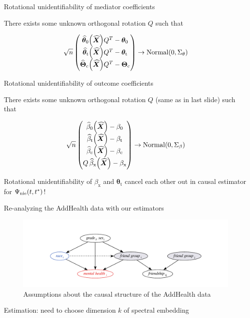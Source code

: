 \documentclass{beamer}
\theoremstyle{remark}
\newcommand{\X}{\bm X}
\newcommand{\Xhat}{\widehat{\X}}
\newcommand{\thetazero}{\bm \theta_0}
\newcommand{\thetat}{\bm \theta_\text{t}}
\newcommand{\Thetac}{\bm \Theta_\text{c}}
\newcommand \thetazerohat [1] {\widehat{\bm \theta}_0 \paren*{#1}}
\newcommand \thetathat [1] {\widehat{\bm \theta}_\text{t} \paren*{#1}}
\newcommand \Thetachat [1] {\widehat{\bm \Theta}_\text{c} \paren*{#1}}
\newcommand{\betazero}{\beta_0}
\newcommand{\betat}{\beta_\text{t}}
\newcommand{\betac}{\beta_\text{c}}
\newcommand{\betax}{\beta_\text{x}}
\newcommand \betazerohat [1] {\widehat{\beta}_0 \paren*{#1}}
\newcommand \betathat [1] {\widehat{\beta}_\text{t} \paren*{#1}}
\newcommand \betachat [1] {\widehat{\beta}_\text{c} \paren*{#1}}
\newcommand \betaxhat [1] {\widehat{\beta}_\text{x} \paren*{#1}}
\newcommand{\nie}{\Psi_\text{nie} \paren*{t, t^*}}
\DeclarePairedDelimiter{\paren}{(}{)}
\begin{document}
\begin{frame}{Rotational unidentifiability of mediator coefficients}

    There exists some unknown orthogonal rotation $Q$ such that

    \begin{align*}
        \sqrt n
        \begin{pmatrix}
            \thetazerohat{\Xhat} Q^T - \thetazero \\
            \thetathat{\Xhat} Q^T - \thetat       \\
            \Thetachat{\Xhat} Q^T - \Thetac
        \end{pmatrix}
        \to
        \mathrm{Normal} \paren*{0, \Sigma_\theta}
    \end{align*}
\end{frame}

\begin{frame}{Rotational unidentifiability of outcome coefficients}

    There exists some unknown orthogonal rotation $Q$ (same as in last slide) such that

    \begin{align*}
        \sqrt n
        \begin{pmatrix}
            \betazerohat{\Xhat} - \betazero \\
            \betathat{\Xhat} - \betat       \\
            \betachat{\Xhat} - \betac       \\
            Q \, \betaxhat{\Xhat} - \betax
        \end{pmatrix}
        \to
        \mathrm{Normal} \paren*{0, \Sigma_\beta}
    \end{align*}

    Rotational unidentifiability of $\betax$ and $\thetat$ cancel each other out in causal estimator for $\nie$!
\end{frame}

\begin{frame}{Re-analyzing the AddHealth data with our estimators}

    \centering

    \begin{figure}
        \includegraphics[width=\textwidth]{figures/addhealth-dag.pdf}
        \caption{Assumptions about the causal structure of the AddHealth data}
        \label{fig:addhealth-dag}
    \end{figure}

    Estimation: need to choose dimension $k$ of spectral embedding

\end{frame}
\end{document}
